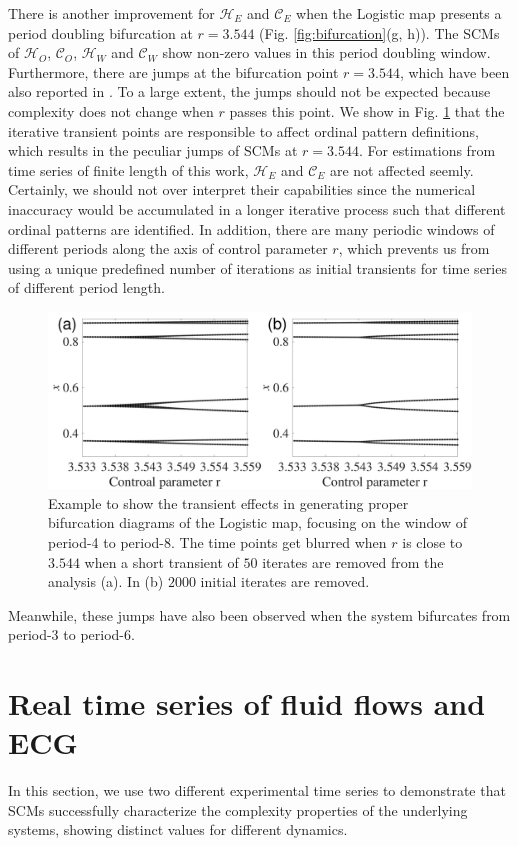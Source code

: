 \documentclass[12pt,aip,cha,reprint,nofootinbib]{revtex4-1}
\begin{document}
There is another improvement for $\mathcal{H}_E$ and $\mathcal{C}_E$ when the Logistic map presents a period doubling bifurcation at $r = 3.544$ (Fig. \ref{fig:bifurcation}(g, h)). The SCMs of $\mathcal{H}_O$,  $\mathcal{C}_O$, $\mathcal{H}_W$ and $\mathcal{C}_W$ show non-zero values in this period doubling window. Furthermore, there are jumps at the bifurcation point $r = 3.544$, which have been also reported in \cite{BandtPRL2002}. To a large extent, the jumps should not be expected because complexity does not change when $r$ passes this point. We show in Fig. \ref{fig:transient} that the iterative transient points are responsible to affect ordinal pattern definitions, which results in the peculiar jumps of SCMs at $r = 3.544$. For estimations from time series of finite length of this work, $\mathcal{H}_E$ and $\mathcal{C}_E$ are not affected seemly. Certainly, we should not over interpret their capabilities since the numerical inaccuracy would be accumulated in a longer iterative process such that different ordinal patterns are identified. In addition, there are many periodic windows of different periods along the axis of control parameter $r$, which prevents us from using a unique predefined number of iterations as initial transients for time series of different period length. 
\begin{figure}
	\centering
	\includegraphics[width=\columnwidth]{period4_exampleTransients.pdf}
\caption{\small{Example to show the transient effects in generating proper bifurcation diagrams of the Logistic map, focusing on the window of period-4 to period-8. The time points get blurred when $r$ is close to $3.544$ when a short transient of $50$ iterates are removed from the analysis (a). In (b) $2000$ initial iterates are removed. }\label{fig:transient}}
\end{figure}
Meanwhile, these jumps have also been observed when the system bifurcates from period-3 to period-6. 

\section{Real time series of fluid flows and ECG} \label{sec:time}
In this section, we use two different experimental time series to demonstrate that SCMs successfully characterize the complexity properties of the underlying systems, showing distinct values for different dynamics. 
\end{document}
